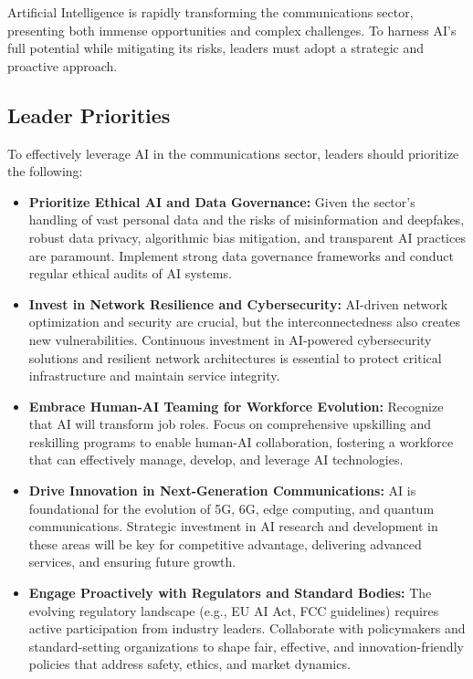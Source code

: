 Artificial Intelligence is rapidly transforming the communications sector, presenting both immense opportunities and complex challenges. To harness AI's full potential while mitigating its risks, leaders must adopt a strategic and proactive approach.

\subsection{Leader Priorities}

To effectively leverage AI in the communications sector, leaders should prioritize the following:
\begin{itemize}
    \item \textbf{Prioritize Ethical AI and Data Governance:}
Given the sector's handling of vast personal data and the risks of misinformation and deepfakes, robust data privacy, algorithmic bias mitigation, and transparent AI practices are paramount. Implement strong data governance frameworks and conduct regular ethical audits of AI systems.
    \item \textbf{Invest in Network Resilience and Cybersecurity:}
AI-driven network optimization and security are crucial, but the interconnectedness also creates new vulnerabilities. Continuous investment in AI-powered cybersecurity solutions and resilient network architectures is essential to protect critical infrastructure and maintain service integrity.
    \item \textbf{Embrace Human-AI Teaming for Workforce Evolution:}
Recognize that AI will transform job roles. Focus on comprehensive upskilling and reskilling programs to enable human-AI collaboration, fostering a workforce that can effectively manage, develop, and leverage AI technologies.
    \item \textbf{Drive Innovation in Next-Generation Communications:}
AI is foundational for the evolution of 5G, 6G, edge computing, and quantum communications. Strategic investment in AI research and development in these areas will be key for competitive advantage, delivering advanced services, and ensuring future growth.
    \item \textbf{Engage Proactively with Regulators and Standard Bodies:}
The evolving regulatory landscape (e.g., EU AI Act, FCC guidelines) requires active participation from industry leaders. Collaborate with policymakers and standard-setting organizations to shape fair, effective, and innovation-friendly policies that address safety, ethics, and market dynamics.
\end{itemize}

